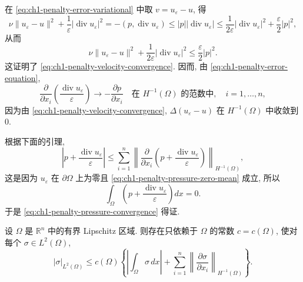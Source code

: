\begin{Proof}
在 \eqref{eq:ch1-penalty-error-variational} 中取 $v=u_\varepsilon-u$, 得
\[
\nu\lVert u_\varepsilon-u\rVert^2
+\frac{1}{\varepsilon}\lvert\operatorname{div}u_\varepsilon\rvert^2
=-(p,\operatorname{div}u_\varepsilon)
\leq\lvert p\rvert\lvert\operatorname{div}u_\varepsilon\rvert
\leq\frac{1}{2\varepsilon}\lvert\operatorname{div}u_\varepsilon\rvert^2
+\frac{\varepsilon}{2}\lvert p\rvert^2,
\]
从而
\begin{equation}
\nu\lVert u_\varepsilon-u\rVert^2
+\frac{1}{2\varepsilon}\lvert\operatorname{div}u_\varepsilon\rvert^2
\leq\frac{\varepsilon}{2}\lvert p\rvert^2.
\label{eq:ch1-penalty-basic-estimate}
\end{equation}
这证明了 \eqref{eq:ch1-penalty-velocity-convergence}. 因而, 由 \eqref{eq:ch1-penalty-error-equation},
\begin{equation}
\frac{\partial}{\partial x_i}
\left(\frac{\operatorname{div}u_\varepsilon}{\varepsilon}\right)
\longrightarrow-\frac{\partial p}{\partial x_i}
\quad\text{在 }H^{-1}(\Omega)\text{ 的范数中},
\quad i=1,\ldots,n,
\label{eq:ch1-penalty-pressure-derivative-convergence}
\end{equation}
因为由 \eqref{eq:ch1-penalty-velocity-convergence}, $\Delta(u_\varepsilon-u)$ 在 $H^{-1}(\Omega)$ 中收敛到 $0$.

根据下面的引理,
\begin{equation}
\left\lvert p+\frac{\operatorname{div}u_\varepsilon}{\varepsilon}\right\rvert
\leq\sum_{i=1}^{n}
\left\lVert\frac{\partial}{\partial x_i}
\left(p+\frac{\operatorname{div}u_\varepsilon}{\varepsilon}\right)
\right\rVert_{H^{-1}(\Omega)},
\label{eq:ch1-penalty-pressure-lemma-application}
\end{equation}
这是因为 $u_\varepsilon$ 在 $\partial\Omega$ 上为零且 \eqref{eq:ch1-penalty-pressure-zero-mean} 成立, 所以
\[
\int_\Omega\left(p+\frac{\operatorname{div}u_\varepsilon}{\varepsilon}\right)dx=0.
\]
于是 \eqref{eq:ch1-penalty-pressure-convergence} 得证.
\end{Proof}

\begin{Lemma}
\label{lem:ch1-negative-norm-pressure-estimate}
设 $\Omega$ 是 $\mathbb R^n$ 中的有界 Lipschitz 区域. 则存在只依赖于 $\Omega$ 的常数 $c=c(\Omega)$, 使对每个 $\sigma\in L^2(\Omega)$,
\begin{equation}
\lvert\sigma\rvert_{L^2(\Omega)}
\leq c(\Omega)\left\{
\left\lvert\int_\Omega\sigma\,dx\right\rvert
+\sum_{i=1}^{n}
\left\lVert\frac{\partial\sigma}{\partial x_i}\right\rVert_{H^{-1}(\Omega)}
\right\}.
\label{eq:ch1-negative-norm-pressure-estimate}
\end{equation}
\end{Lemma}

